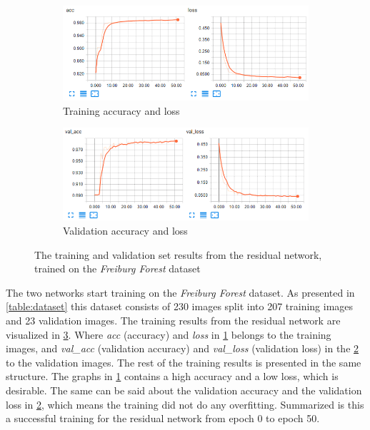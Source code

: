 \documentclass[USenglish]{ifimaster}  %
\begin{document}
\begin{figure}[ht]
\centering
\begin{subfigure}[b]{\textwidth}
\centering
\includegraphics[width=1\textwidth]{bilder/freiburg_training/freiburg_residual_training_acc_results.png}
\caption{Training accuracy and loss}
\label{fig:freiburg_residual_acc_result}
\end{subfigure}
\hfill
\begin{subfigure}[b]{\textwidth}
\centering
\includegraphics[width=1\textwidth]{bilder/freiburg_training/freiburg_residual_training_val_acc_results.png}
\caption{Validation accuracy and loss}
\label{fig:freiburg_residual_val_acc_result}
\end{subfigure}
\caption{The training and validation set results from the residual network, trained on the \textit{Freiburg Forest} dataset}
\label{fig:freiburg_residual_result}
\end{figure}

The two networks start training on the \textit{Freiburg Forest} dataset. As presented in \cref{table:dataset} this dataset consists of 230 images split into 207 training images and 23 validation images. The training results from the residual network are visualized in \cref{fig:freiburg_residual_result}. Where \textit{acc} (accuracy) and \textit{loss} in \cref{fig:freiburg_residual_acc_result} belongs to the training images, and \textit{val\_acc} (validation accuracy) and \textit{val\_loss} (validation loss) in the \cref{fig:freiburg_residual_val_acc_result} to the validation images. The rest of the training results is presented in the same structure. The graphs in \cref{fig:freiburg_residual_acc_result} contains a high accuracy and a low loss, which is desirable. The same can be said about the validation accuracy and the validation loss in \cref{fig:freiburg_residual_val_acc_result}, which means the training did not do any overfitting. Summarized is this a successful training for the residual network from epoch 0 to epoch 50.
\end{document}
